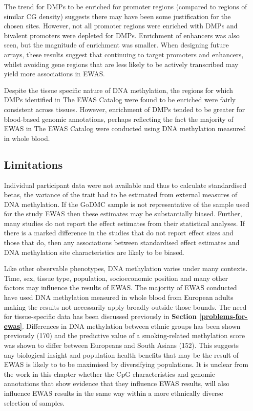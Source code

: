 \documentclass[11pt,oneside]{bristolthesis}
\begin{document}
The trend for DMPs to be enriched for promoter regions (compared to regions of similar CG density) suggests there may have been some justification for the chosen sites. However, not all promoter regions were enriched with DMPs and bivalent promoters were depleted for DMPs. Enrichment of enhancers was also seen, but the magnitude of enrichment was smaller. When designing future arrays, these results suggest that continuing to target promoters and enhancers, whilst avoiding gene regions that are less likely to be actively transcribed may yield more associations in EWAS.

Despite the tissue specific nature of DNA methylation, the regions for which DMPs identified in The EWAS Catalog were found to be enriched were fairly consistent across tissues. However, enrichment of DMPs tended to be greater for blood-based genomic annotations, perhaps reflecting the fact the majority of EWAS in The EWAS Catalog were conducted using DNA methylation measured in whole blood.

\hypertarget{limitations-04}{%
\subsection{Limitations}\label{limitations-04}}

Individual participant data were not available and thus to calculate standardised betas, the variance of the trait had to be estimated from external measures of DNA methylation. If the GoDMC sample is not representative of the sample used for the study EWAS then these estimates may be substantially biased. Further, many studies do not report the effect estimates from their statistical analyses. If there is a marked difference in the studies that do not report effect sizes and those that do, then any associations between standardised effect estimates and DNA methylation site characteristics are likely to be biased.

Like other observable phenotypes, DNA methylation varies under many contexts. Time, sex, tissue type, population, socioeconomic position and many other factors may influence the results of EWAS. The majority of EWAS conducted have used DNA methylation measured in whole blood from European adults making the results not necessarily apply broadly outside those bounds. The need for tissue-specific data has been discussed previously in \textbf{Section \ref{problems-for-ewas}}. Differences in DNA methylation between ethnic groups has been shown previously (170) and the predictive value of a smoking-related methylation score was shown to differ between Europeans and South Asians (152). This suggests any biological insight and population health benefits that may be the result of EWAS is likely to to be maximised by diversifying populations. It is unclear from the work in this chapter whether the CpG characteristics and genomic annotations that show evidence that they influence EWAS results, will also influence EWAS results in the same way within a more ethnically diverse selection of samples.
\end{document}
